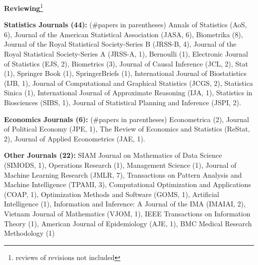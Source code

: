 \documentclass{article}
\begin{document}



\vspace{7mm}
\begin{large}
\noindent \textbf{Reviewing}\footnote{reviews of revisions not included}
\end{large}

\vspace{2mm}
\noindent \textbf{Statistics Journals (44): }(\#papers in parentheses) Annals of Statistics (AoS, 6), Journal of the American Statistical Association (JASA, 6), Biometrika (8), Journal of the Royal Statistical Society-Series B (JRSS-B, 4), Journal of the Royal Statistical Society-Series A (JRSS-A, 1), Bernoulli (1), Electronic Journal of Statistics (EJS, 2), Biometrics (3), Journal of Causal Inference (JCL, 2), Stat (1), Springer Book (1), SpringerBriefs (1), International Journal of Biostatistics (IJB, 1), Journal of Computational and Graphical Statistics (JCGS, 2), Statistica Sinica (1), International Journal of Approximate Reasoning (IJA, 1), Statistics in Biosciences (SIBS, 1), Journal of Statistical Planning and Inference (JSPI, 2).

\vspace{2mm}
\noindent \textbf{Economics Journals (6): }(\#papers in parentheses) Econometrica (2), Journal of Political Economy (JPE, 1), The Review of Economics and Statistics (ReStat, 2), Journal of Applied Econometrics (JAE, 1).

\vspace{2mm}
\noindent \textbf{Other Journals (22): } SIAM Journal on Mathematics of Data Science (SIMODS, 1), Operations Research (1), Management Science (1), Journal of Machine Learning Research (JMLR, 7), Transactions on Pattern Analysis and Machine Intelligence (TPAMI, 3), Computational Optimization and Applications (COAP, 1), Optimization Methods and Software (GOMS, 1), Artificial Intelligence (1), Information and Inference: A Journal of the IMA (IMAIAI, 2), Vietnam Journal of Mathematics (VJOM, 1), IEEE Transactions on Information Theory (1), American Journal of Epidemiology (AJE, 1), BMC Medical Research Methodology (1)
\end{document}
